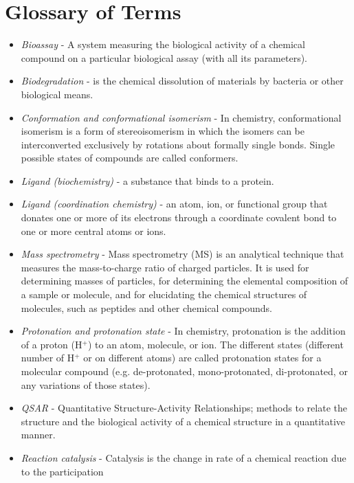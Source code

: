 \documentclass{sig-alternate}
\begin{document}



\appendix

\section{Glossary of Terms}
\begin{itemize}
\item \textit{Bioassay} - A system measuring the biological activity of a chemical compound on a particular
    biological assay (with all its parameters).
\item \textit{Biodegradation} - is the chemical dissolution of materials by bacteria or other biological means.
\item \textit{Conformation and conformational isomerism} - In chemistry, conformational isomerism is a form of
    stereoisomerism in which the isomers can be interconverted exclusively by rotations about formally single
    bonds.
    Single possible states of compounds are called conformers.
\item \textit{Ligand (biochemistry)} - a substance that binds to a protein.
\item \textit{Ligand (coordination chemistry)} - an atom, ion, or functional group that donates one or more of its
    electrons through a coordinate covalent bond to one or more central atoms or ions.
\item \textit{Mass spectrometry} - Mass spectrometry (MS) is an analytical technique that measures the
    mass-to-charge ratio of charged particles. It is used for determining masses of particles, for determining the
    elemental composition of a sample or molecule, and for elucidating the chemical structures of molecules, such
    as
    peptides and other chemical compounds.
\item \textit{Protonation and protonation state} - In chemistry, protonation is the addition of a proton (H$^+$) to
    an atom, molecule, or ion. The different states (different number of H$^+$ or on different atoms) are called
    protonation states for a molecular compound (e.g. de-protonated, mono-protonated, di-protonated, or any
    variations of those states).
\item \textit{QSAR} - Quantitative Structure-Activity Relationships; methods to relate the structure and the
    biological activity of a chemical structure in a quantitative manner.
\item \textit{Reaction catalysis} - Catalysis is the change in rate of a chemical reaction due to the participation

\end{itemize}
\end{document}
